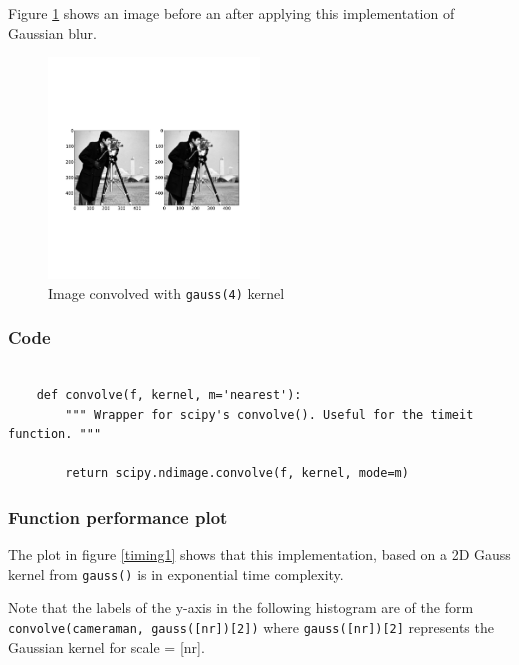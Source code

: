 \documentclass[abstract=true]{scrartcl}
\begin{document}
        Figure \ref{gaussblur} shows an image before an after applying this
        implementation of Gaussian blur.

        \begin{figure}
          \centering
          \includegraphics[width=0.5\textwidth]{../images/gauss2d}
          \caption{Image convolved with \texttt{gauss(4)} kernel}
          \label{gaussblur}
        \end{figure}

        \subsubsection{Code}

            \begin{verbatim}

    def convolve(f, kernel, m='nearest'):
        """ Wrapper for scipy's convolve(). Useful for the timeit function. """

        return scipy.ndimage.convolve(f, kernel, mode=m)

            \end{verbatim}

        \subsubsection{Function performance plot}

            The plot in figure \ref{timing1} shows that this implementation, based on a
            2D Gauss kernel from \texttt{gauss()} is in exponential time
            complexity. 

            Note that the labels of the y-axis in the following histogram are of
            the form \texttt{convolve(cameraman, gauss([nr])[2])} where
            \texttt{gauss([nr])[2]} represents the Gaussian kernel for scale =
            [nr].
        
\end{document}

